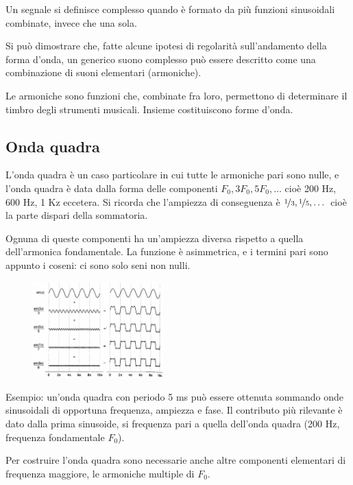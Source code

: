Un segnale si definisce complesso quando è formato da più funzioni sinusoidali combinate, invece che una sola.

Si può dimostrare che, fatte alcune ipotesi di regolarità sull'andamento della forma d'onda, un generico suono complesso può essere descritto come una combinazione di suoni elementari (armoniche).

Le armoniche sono funzioni che, combinate fra loro, permettono di determinare il timbro degli strumenti musicali. Insieme costituiscono forme d'onda. 

\subsection{Onda quadra}
L'onda quadra è un caso particolare in cui tutte le armoniche pari sono nulle, e l'onda quadra è data dalla forma delle componenti $F_0, 3F_0, 5F_0, \dots$ cioè 200 Hz, 600 Hz, 1 Kz eccetera. Si ricorda che l'ampiezza di conseguenza è $\nicefrac{1}{3}, \nicefrac{1}{5}, \dots$ cioè la parte dispari della sommatoria.

Ognuna di queste componenti ha un'ampiezza diversa rispetto a quella dell'armonica fondamentale. La funzione è asimmetrica, e i termini pari sono appunto i coseni: ci sono solo seni non nulli. 

\begin{figure}
	\vspace{-5pt}
	\includegraphics[width=0.45\textwidth]{Lezioni/Immagini/ondaquadra}
	\vspace{-25pt}
\end{figure}

Esempio: un'onda quadra con periodo 5 ms può essere ottenuta sommando onde sinusoidali di opportuna frequenza, ampiezza e fase. Il contributo più rilevante è dato dalla prima sinusoide, si frequenza pari a quella dell'onda quadra (200 Hz, frequenza fondamentale $F_0$).

Per costruire l'onda quadra sono necessarie anche altre componenti elementari di frequenza maggiore, le armoniche multiple di $F_0$. \\

